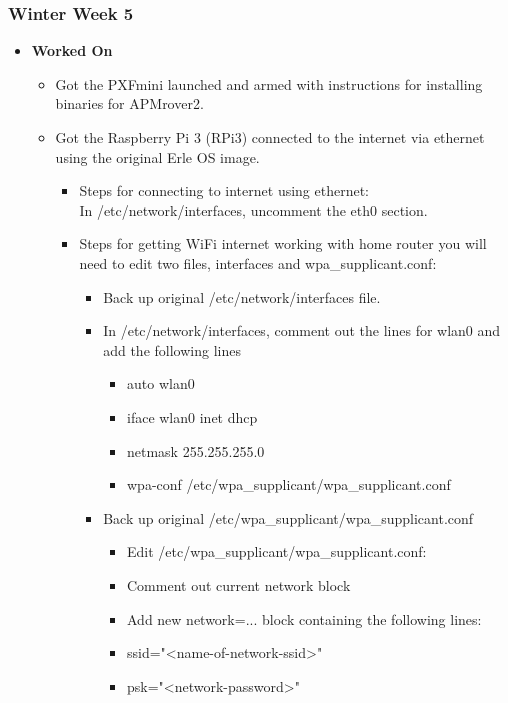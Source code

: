 \documentclass{article}
\begin{document}
\subsubsection{Winter Week 5}
\begin{itemize}
    \item {\textbf{\textbf{Worked On}}}
    \begin{itemize}
        \item Got the PXFmini launched and armed with instructions for installing binaries for APMrover2.
        \item Got the Raspberry Pi 3 (RPi3) connected to the internet via ethernet using the original Erle OS image.
        \begin{itemize}
            \item Steps for connecting to internet using ethernet:\\
            In /etc/network/interfaces, uncomment the eth0 section.
            \item Steps for getting WiFi internet working with home router you will need to edit two files, interfaces and wpa\_supplicant.conf:
            \begin{itemize}
                \item Back up original /etc/network/interfaces file.
                \item In /etc/network/interfaces, comment out the lines for wlan0 and add the following lines
                \begin{itemize}
                    \item auto wlan0
                    \item iface wlan0 inet dhcp
                    \item netmask 255.255.255.0
                    \item wpa-conf /etc/wpa\_supplicant/wpa\_supplicant.conf
                \end{itemize}
                \item Back up original /etc/wpa\_supplicant/wpa\_supplicant.conf
                \begin{itemize}
                    \item Edit /etc/wpa\_supplicant/wpa\_supplicant.conf:
                    \item Comment out current network block
                    \item Add new network={...} block containing the following lines:
                    \item ssid="<name-of-network-ssid>"
                    \item psk="<network-password>"
                \end{itemize}


\end{itemize}
\end{itemize}
\end{itemize}
\end{itemize}
\end{document}
